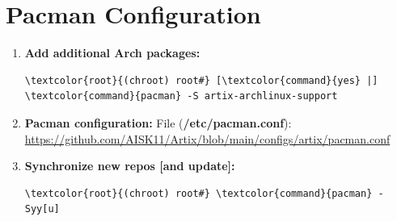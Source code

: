 \documentclass[10pt, a4paper, onecolumn, oneside, titlepage, openany]{book}
\begin{document}
\section{Pacman Configuration}
\begin{enumerate}
    \item \textbf{Add additional Arch packages:}
\begin{Verbatim}[commandchars=\\\{\}]
\textcolor{root}{(chroot) root#} [\textcolor{command}{yes} |] \textcolor{command}{pacman} -S artix-archlinux-support
\end{Verbatim}
    \item \textbf{Pacman configuration:}
\newline File (\textbf{\textcolor{file}{/etc/pacman.conf}}):
\newline \url{https://github.com/AISK11/Artix/blob/main/configs/artix/pacman.conf}
    \item \textbf{Synchronize new repos [and update]:}
\begin{Verbatim}[commandchars=\\\{\}]
\textcolor{root}{(chroot) root#} \textcolor{command}{pacman} -Syy[u]
\end{Verbatim}
\end{enumerate}
\end{document}
